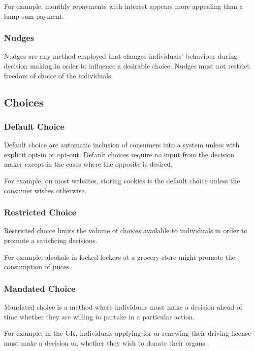 \documentclass[a4paper,10pt]{article}
\begin{document}
\begin{multicols*}{2}
	For example, monthly repayments with interest appears more appealing than a lump sum payment.

	\subsubsection{Nudges}
	Nudges are any method employed that changes individuals' behaviour during decision making in order to influence a desirable choice. Nudges must not restrict freedom of choice of the individuals.

	\subsection{Choices}
	\subsubsection{Default Choice}
	Default choice are automatic inclusion of consumers into a system unless with explicit opt-in or opt-out. Default choices require no input from the decision maker except in the cases where the opposite is desired.
	\medskip

	For example, on most websites, storing cookies is the default choice unless the consumer wishes otherwise.

	\subsubsection{Restricted Choice}
	Restricted choice limits the volume of choices available to individuals in order to promote a satisficing decisions.
	\medskip

	For example, alcohols in locked lockers at a grocery store might promote the consumption of juices.

	\subsubsection{Mandated Choice}
	Mandated choice is a method where individuals must make a decision ahead of time whether they are willing to partake in a particular action.
	\medskip

	For example, in the UK, individuals applying for or renewing their driving license must make a decision on whether they wish to donate their organs.
\end{multicols*}
\end{document}

